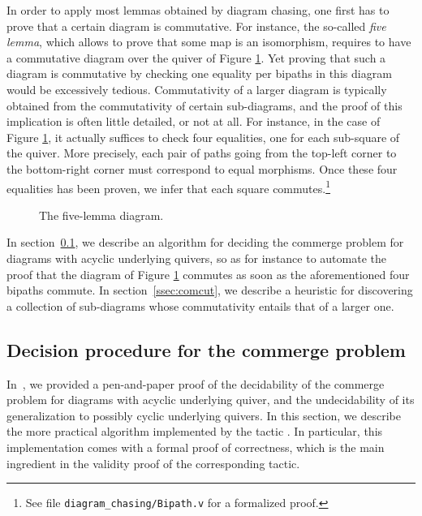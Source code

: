 In order to apply most lemmas obtained by diagram chasing, one first has to prove that a certain diagram is commutative. For instance, the so-called \emph{five lemma}, which allows to prove that some map is an isomorphism, requires to have a commutative diagram over the quiver of Figure \ref{fig:five-lemma}. Yet proving that such a diagram is commutative by checking one equality per bipaths in this diagram would be excessively tedious. Commutativity of a larger diagram is typically obtained from the commutativity of certain sub-diagrams, and the proof of this implication is often little detailed, or not at all. For instance, in the case of Figure \ref{fig:five-lemma}, it actually suffices to check four equalities, one for each sub-square of the quiver. More precisely, each pair of paths going from the top-left corner to the bottom-right corner must correspond to equal morphisms. Once these four equalities has been proven, we infer that each square commutes.\footnote{See file \texttt{diagram\_chasing/Bipath.v} for a formalized proof.}
\begin{figure}[h]
  \begin{center}
  \end{center}
  \caption{The five-lemma diagram. \label{fig:five-lemma}}
\end{figure}

In section~\ref{ssec:commerge}, we describe an algorithm for deciding the commerge problem for diagrams with acyclic underlying quivers, so as for instance to automate the proof that the diagram of Figure \ref{fig:five-lemma} commutes as soon as the aforementioned four bipaths commute. In section~\ref{ssec:comcut}, we describe a heuristic for discovering a collection of sub-diagrams whose commutativity entails that of a larger one.



\subsection{Decision procedure for the commerge problem}\label{ssec:commerge}

In~\cite{DBLP:conf/csl/MahboubiP24}, we provided a pen-and-paper proof of the decidability of the commerge problem for diagrams with acyclic underlying quiver, and the undecidability of its generalization to possibly cyclic underlying quivers. In this section, we describe the more practical algorithm implemented by the tactic . In particular, this implementation comes with a formal proof of correctness, which is the main ingredient in the validity proof of the corresponding tactic.

